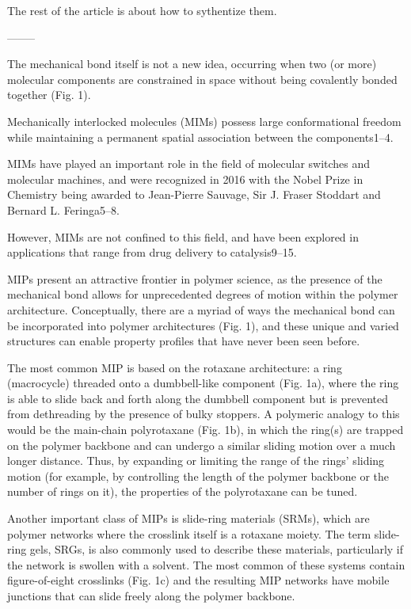 \documentclass[../../main-notes.tex]{subfiles}
\begin{document}
The rest of the article is about how to sythentize them.

--------

\citep{hartMaterialPropertiesApplications2021}

The mechanical bond itself is not a new idea, occurring when two (or more) molecular components are constrained in space without being covalently bonded together (Fig. 1). 

Mechanically interlocked molecules (MIMs) possess large conformational freedom while maintaining a permanent spatial association between the components1–4. 

MIMs have played an important role in the field of molecular switches and molecular machines, and were recognized in 2016 with the Nobel Prize in Chemistry being awarded to Jean-Pierre Sauvage, Sir J. Fraser Stoddart and Bernard L. Feringa5–8. 

However, MIMs are not confined to this field, and have been explored in applications that range from drug delivery to catalysis9–15.

MIPs present an attractive frontier in polymer science, as the presence of the mechanical bond allows for unprecedented degrees of motion within the polymer architecture. 
Conceptually, there are a myriad of ways the mechanical bond can be incorporated into polymer architectures (Fig. 1), and these unique and varied structures can enable property profiles that have never been seen before.


The most common MIP is based on the rotaxane architecture: a ring (macrocycle) threaded onto a dumbbell-like component (Fig. 1a), where the ring is able to slide back and forth along the dumbbell component but is prevented from dethreading by the presence of bulky stoppers. 
A polymeric analogy to this would be the main-chain polyrotaxane (Fig. 1b), in which the ring(s) are trapped on the polymer backbone and can undergo a similar sliding motion over a much longer distance. 
Thus, by expanding or limiting the range of the rings’ sliding motion (for example, by controlling the length of the polymer backbone or the number of rings on it), the properties of the polyrotaxane can be tuned. 

Another important class of MIPs is slide-ring materials (SRMs), which are polymer networks where the crosslink itself is a rotaxane moiety. 
The term slide-ring gels, SRGs, is also commonly used to describe these materials, particularly if the network is swollen with a solvent. 
The most common of these systems contain figure-of-eight crosslinks (Fig. 1c) and the resulting MIP networks have mobile junctions that can slide freely along the polymer backbone. 
\end{document}
